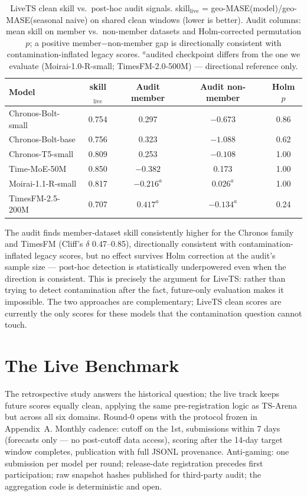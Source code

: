 \documentclass{article}
\begin{document}
\begin{table}[t]
  \caption{LiveTS clean skill vs.\ post-hoc audit signals. skill$_{\text{live}}$ = geo-MASE(model)/geo-MASE(seasonal naive) on shared clean windows (lower is better). Audit columns: mean skill on member vs.\ non-member datasets and Holm-corrected permutation $p$; a positive member$-$non-member gap is directionally consistent with contamination-inflated legacy scores. $^{a}$audited checkpoint differs from the one we evaluate (Moirai-1.0-R-small; TimesFM-2.0-500M) --- directional reference only.}
  \label{tab:contamination}
  \centering
  \small
  \begin{tabular}{lcccc}
    \toprule
    Model & skill$_{\text{live}}$ & Audit member & Audit non-member & Holm $p$ \\
    \midrule
    Chronos-Bolt-small & 0.754 & 0.297 & $-0.673$ & 0.86 \\
    Chronos-Bolt-base & 0.756 & 0.323 & $-1.088$ & 0.62 \\
    Chronos-T5-small & 0.809 & 0.253 & $-0.108$ & 1.00 \\
    Time-MoE-50M & 0.850 & $-0.382$ & 0.173 & 1.00 \\
    Moirai-1.1-R-small & 0.817 & $-0.216^{a}$ & $0.026^{a}$ & 1.00 \\
    TimesFM-2.5-200M & 0.707 & $0.417^{a}$ & $-0.134^{a}$ & 0.24 \\
    \bottomrule
  \end{tabular}
\end{table}

The audit finds member-dataset skill consistently higher for the Chronos family and TimesFM (Cliff's $\delta$ 0.47--0.85), directionally consistent with contamination-inflated legacy scores, but no effect survives Holm correction at the audit's sample size --- post-hoc detection is statistically underpowered even when the direction is consistent. This is precisely the argument for LiveTS: rather than trying to detect contamination after the fact, future-only evaluation makes it impossible. The two approaches are complementary; LiveTS clean scores are currently the only scores for these models that the contamination question cannot touch.

\section{The Live Benchmark}\label{sec:live}

The retrospective study answers the historical question; the live track keeps future scores equally clean, applying the same pre-registration logic as TS-Arena \citep{meyer2026tsarena} but across all six domains. Round-0 opens with the protocol frozen in Appendix~A. Monthly cadence: cutoff on the 1st, submissions within 7 days (forecasts only --- no post-cutoff data access), scoring after the 14-day target window completes, publication with full JSONL provenance. Anti-gaming: one submission per model per round; release-date registration precedes first participation; raw snapshot hashes published for third-party audit; the aggregation code is deterministic and open.
\end{document}
